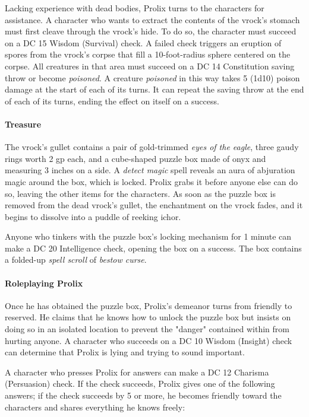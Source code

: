 \documentclass[a4paper, 11pt, bg=full, twocolumn, nooutline]{dndbook}
\begin{document}
Lacking experience with dead bodies, Prolix turns to the characters for assistance. A character who wants to extract the contents of the vrock's stomach must first cleave through the vrock's hide. To do so, the character must succeed on a DC 15 Wisdom (Survival) check. A failed check triggers an eruption of spores from the vrock's corpse that fill a 10-foot-radius sphere centered on the corpse. All creatures in that area must succeed on a DC 14 Constitution saving throw or become \textit{poisoned}. A creature \textit{poisoned} in this way takes 5 (1d10) poison damage at the start of each of its turns. It can repeat the saving throw at the end of each of its turns, ending the effect on itself on a success.

\paragraph{Treasure}

The vrock's gullet contains a pair of gold-trimmed \textit{eyes of the eagle}, three gaudy rings worth 2 gp each, and a cube-shaped puzzle box made of onyx and measuring 3 inches on a side. A \textit{detect magic} spell reveals an aura of abjuration magic around the box, which is locked. Prolix grabs it before anyone else can do so, leaving the other items for the characters. As soon as the puzzle box is removed from the dead vrock's gullet, the enchantment on the vrock fades, and it begins to dissolve into a puddle of reeking ichor.

Anyone who tinkers with the puzzle box's locking mechanism for 1 minute can make a DC 20 Intelligence check, opening the box on a success. The box contains a folded-up \textit{spell scroll} of \textit{bestow curse}.


\paragraph{Roleplaying Prolix}

Once he has obtained the puzzle box, Prolix's demeanor turns from friendly to reserved. He claims that he knows how to unlock the puzzle box but insists on doing so in an isolated location to prevent the "danger" contained within from hurting anyone. A character who succeeds on a DC 10 Wisdom (Insight) check can determine that Prolix is lying and trying to sound important.

A character who presses Prolix for answers can make a DC 12 Charisma (Persuasion) check. If the check succeeds, Prolix gives one of the following answers; if the check succeeds by 5 or more, he becomes friendly toward the characters and shares everything he knows freely:
\end{document}
